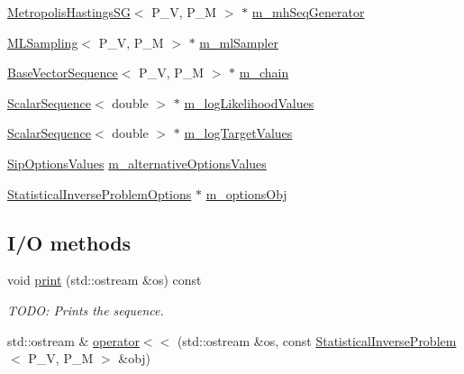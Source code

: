 \begin{DoxyCompactItemize}
\item 
\hyperlink{class_q_u_e_s_o_1_1_metropolis_hastings_s_g}{Metropolis\-Hastings\-S\-G}$<$ P\-\_\-\-V, P\-\_\-\-M $>$ $\ast$ \hyperlink{class_q_u_e_s_o_1_1_statistical_inverse_problem_af66c3780c9b23fc917dca0ea6dc12103}{m\-\_\-mh\-Seq\-Generator}
\item 
\hyperlink{class_q_u_e_s_o_1_1_m_l_sampling}{M\-L\-Sampling}$<$ P\-\_\-\-V, P\-\_\-\-M $>$ $\ast$ \hyperlink{class_q_u_e_s_o_1_1_statistical_inverse_problem_a8410eadca0a84c3ee1ad2e934a2c6d10}{m\-\_\-ml\-Sampler}
\item 
\hyperlink{class_q_u_e_s_o_1_1_base_vector_sequence}{Base\-Vector\-Sequence}$<$ P\-\_\-\-V, P\-\_\-\-M $>$ $\ast$ \hyperlink{class_q_u_e_s_o_1_1_statistical_inverse_problem_a5f6b98058067d21fb16981844e32910d}{m\-\_\-chain}
\item 
\hyperlink{class_q_u_e_s_o_1_1_scalar_sequence}{Scalar\-Sequence}$<$ double $>$ $\ast$ \hyperlink{class_q_u_e_s_o_1_1_statistical_inverse_problem_a7138a1175f641633f69ab90617fc5f8c}{m\-\_\-log\-Likelihood\-Values}
\item 
\hyperlink{class_q_u_e_s_o_1_1_scalar_sequence}{Scalar\-Sequence}$<$ double $>$ $\ast$ \hyperlink{class_q_u_e_s_o_1_1_statistical_inverse_problem_aa84ebc22eac5f609d5e269a9ed25c6aa}{m\-\_\-log\-Target\-Values}
\item 
\hyperlink{class_q_u_e_s_o_1_1_sip_options_values}{Sip\-Options\-Values} \hyperlink{class_q_u_e_s_o_1_1_statistical_inverse_problem_a71659d2393ea46940f963acc95285f17}{m\-\_\-alternative\-Options\-Values}
\item 
\hyperlink{class_q_u_e_s_o_1_1_statistical_inverse_problem_options}{Statistical\-Inverse\-Problem\-Options} $\ast$ \hyperlink{class_q_u_e_s_o_1_1_statistical_inverse_problem_a481954f01d55bab4c1a36392fecb4a12}{m\-\_\-options\-Obj}
\end{DoxyCompactItemize}
\subsection*{I/\-O methods}
\begin{DoxyCompactItemize}
\item 
void \hyperlink{class_q_u_e_s_o_1_1_statistical_inverse_problem_a1f5e10175b41d273d86e54c61cf44839}{print} (std\-::ostream \&os) const 
\begin{DoxyCompactList}\small\item\em T\-O\-D\-O\-: Prints the sequence. \end{DoxyCompactList}\item 
std\-::ostream \& \hyperlink{class_q_u_e_s_o_1_1_statistical_inverse_problem_a4354becd88247e1704b4f9b07faf9e55}{operator$<$$<$} (std\-::ostream \&os, const \hyperlink{class_q_u_e_s_o_1_1_statistical_inverse_problem}{Statistical\-Inverse\-Problem}$<$ P\-\_\-\-V, P\-\_\-\-M $>$ \&obj)
\end{DoxyCompactItemize}


